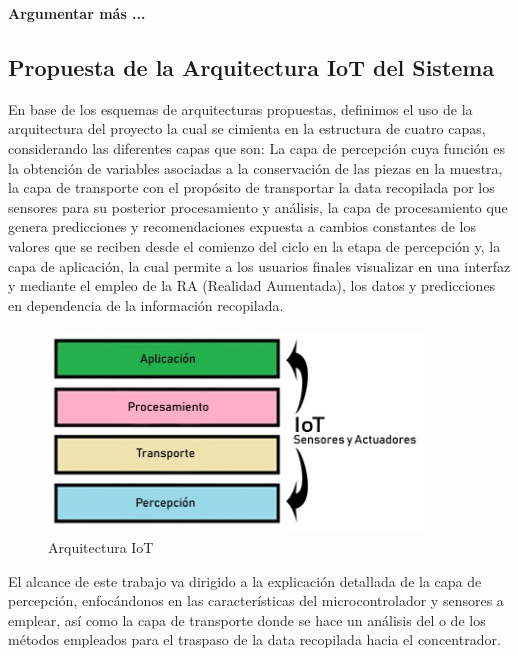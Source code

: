     \textbf{Argumentar más ...}

    \subsection{Propuesta de la Arquitectura IoT del Sistema}

    En base de los esquemas de arquitecturas propuestas, definimos el uso de la arquitectura del proyecto la cual se cimienta en la estructura de cuatro capas, considerando las diferentes capas que son: La capa de percepción cuya función es la obtención de variables asociadas a la conservación de las piezas en la muestra, la capa de transporte con el propósito de transportar la data recopilada por los sensores para su posterior procesamiento y análisis, la capa de procesamiento que genera predicciones y recomendaciones expuesta a cambios constantes de los valores que se reciben desde el comienzo del ciclo en la etapa de percepción y, la capa de aplicación, la cual permite a los usuarios finales visualizar en una interfaz y mediante el empleo de la RA (Realidad Aumentada), los datos y predicciones en dependencia de la información recopilada.\\

    \begin{figure}[h]
        \hspace{4.6cm}
        \includegraphics[width=10cm, height=5.4cm]{imagenes/myArquitecture2.jpg}
        \caption{Arquitectura IoT}
        \label{imag:arquitectura_iot}
    \end{figure}

    El alcance de este trabajo va dirigido a la explicación detallada de la capa de percepción, enfocándonos en las características del microcontrolador y sensores a emplear, así como la capa de transporte donde se hace un análisis del o de los métodos empleados para el traspaso de la data recopilada hacia el concentrador.\\\\


